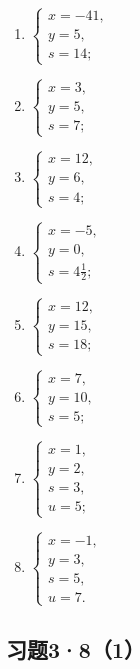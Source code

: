 \begin{enumerate}[start=1]
\item
  \(\left\{ \begin{array}{l} x = -41, \\ y = 5, \\ s = 14; \end{array} \right.\)
\item
  \(\left\{ \begin{array}{l} x = 3, \\ y = 5, \\ s = 7; \end{array} \right.\)
\item
  \(\left\{ \begin{array}{l} x = 12, \\ y = 6, \\ s = 4; \end{array} \right.\)
\item
  \(\left\{ \begin{array}{l} x = -5, \\ y = 0, \\ s = 4\frac{1}{2}; \end{array} \right.\)
\item
  \(\left\{ \begin{array}{l} x = 12, \\ y = 15, \\ s = 18; \end{array} \right.\)
\item
  \(\left\{ \begin{array}{l} x = 7, \\ y = 10, \\ s = 5; \end{array} \right.\)
\item
  \(\left\{ \begin{array}{l} x = 1, \\ y = 2, \\ s = 3, \\ u = 5; \end{array} \right.\)
\item
  \(\left\{ \begin{array}{l} x = -1, \\ y = 3, \\ s = 5, \\ u = 7. \end{array} \right.\)
\end{enumerate}

\subsection{习题3·8（1）}

